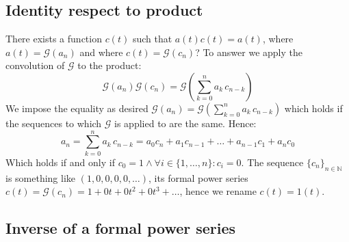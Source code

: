 \subsection{Identity respect to product}

There exists a function $c(t)$ such that $a(t)c(t)=a(t)$, where $a(t)
= \mathcal{G} (a_n)$ and where $c(t) = \mathcal{G} (c_n)$? To answer
we apply the convolution of $\mathcal{G} $ to the product:
\begin{displaymath}
  \mathcal{G} (a_n)\mathcal{G} (c_n) = \mathcal{G}\left(
    \sum_{k=0}^{n}{a}_{k}\,{c}_{n-k}\right)
\end{displaymath}
We impose the equality as desired $\mathcal{G} (a_n) = \mathcal{G}\left(
  \sum_{k=0}^{n}{a}_{k}\,{c}_{n-k}\right)$ which holds if the
sequences to which $\mathcal{G} $ is applied to are the same. Hence:
\begin{displaymath}
  a_n = \sum_{k=0}^{n}{a}_{k}\,{c}_{n-k} = a_0 c_n + a_1 c_{n-1} +
  \ldots + a_{n-1} c_1 + a_n c_0
\end{displaymath}
Which holds if and only if $c_0 = 1 \wedge \forall
i\in\{1,\ldots,n\}:c_i = 0$. The sequence $\{c_n\}_{n\in \mathbb{N} }$
is something like $(1,0,0,0,0,\ldots)$, its formal power series $c(t)
= \mathcal{G}(c_n) = 1 + 0t + 0t^2 + 0t^3 + \ldots $, hence we rename
$c(t) = 1(t)$.

\subsection{Inverse of a formal power series}


